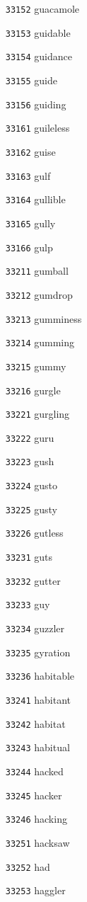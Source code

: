 \documentclass[twoside,11pt]{article}
\begin{document}
\begin{multicols}{5}
\begin{enumerate}
\item[\texttt{33152}] guacamole
\item[\texttt{33153}] guidable
\item[\texttt{33154}] guidance
\item[\texttt{33155}] guide
\item[\texttt{33156}] guiding
\item[\texttt{33161}] guileless
\item[\texttt{33162}] guise
\item[\texttt{33163}] gulf
\item[\texttt{33164}] gullible
\item[\texttt{33165}] gully
\item[\texttt{33166}] gulp
\item[\texttt{33211}] gumball
\item[\texttt{33212}] gumdrop
\item[\texttt{33213}] gumminess
\item[\texttt{33214}] gumming
\item[\texttt{33215}] gummy
\item[\texttt{33216}] gurgle
\item[\texttt{33221}] gurgling
\item[\texttt{33222}] guru
\item[\texttt{33223}] gush
\item[\texttt{33224}] gusto
\item[\texttt{33225}] gusty
\item[\texttt{33226}] gutless
\item[\texttt{33231}] guts
\item[\texttt{33232}] gutter
\item[\texttt{33233}] guy
\item[\texttt{33234}] guzzler
\item[\texttt{33235}] gyration
\item[\texttt{33236}] habitable
\item[\texttt{33241}] habitant
\item[\texttt{33242}] habitat
\item[\texttt{33243}] habitual
\item[\texttt{33244}] hacked
\item[\texttt{33245}] hacker
\item[\texttt{33246}] hacking
\item[\texttt{33251}] hacksaw
\item[\texttt{33252}] had
\item[\texttt{33253}] haggler

\end{enumerate}
\end{multicols}
\end{document}
